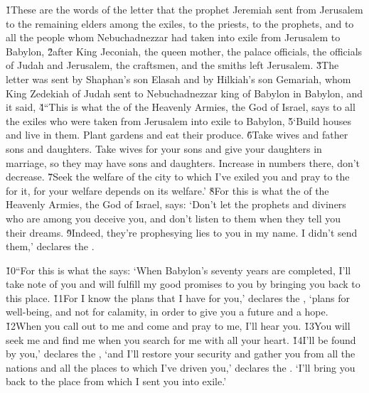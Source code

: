 \v{1}These are the words of the letter that the prophet Jeremiah sent from Jerusalem to the remaining elders among the exiles, to the priests, to the prophets, and to all the people whom Nebuchadnezzar had taken into exile from Jerusalem to Babylon, \v{2}after King Jeconiah, the queen mother, the palace officials, the officials of Judah and Jerusalem, the craftsmen, and the smiths left Jerusalem. \v{3}The letter was sent by Shaphan's son Elasah and by Hilkiah's son Gemariah, whom King Zedekiah of Judah sent to Nebuchadnezzar king of Babylon in Babylon, and it said, \v{4}``This is what the  of the Heavenly Armies, the God of Israel, says to all the exiles who were taken from Jerusalem into exile to Babylon, \v{5}`Build houses and live in them. Plant gardens and eat their produce. \v{6}Take wives and father sons and daughters. Take wives for your sons and give your daughters in marriage, so they may have sons and daughters. Increase in numbers there, don't decrease. \v{7}Seek the welfare of the city to which I've exiled you and pray to the  for it, for your welfare depends on its welfare.' \v{8}For this is what the  of the Heavenly Armies, the God of Israel, says: `Don't let the prophets and diviners who are among you deceive you, and don't listen to them when they tell you their dreams. \v{9}Indeed, they're prophesying lies to you in my name. I didn't send them,' declares the .

\v{10}``For this is what the  says: `When Babylon's seventy years are completed, I'll take note of you and will fulfill my good promises to you by bringing you back to this place. \v{11}For I know the plans that I have for you,' declares the , `plans for well-being, and not for calamity, in order to give you a future and a hope. \v{12}When you call out to me and come and pray to me, I'll hear you. \v{13}You will seek me and find me when you search for me with all your heart. \v{14}I'll be found by you,' declares the , `and I'll restore your security and gather you from all the nations and all the places to which I've driven you,' declares the . `I'll bring you back to the place from which I sent you into exile.'

